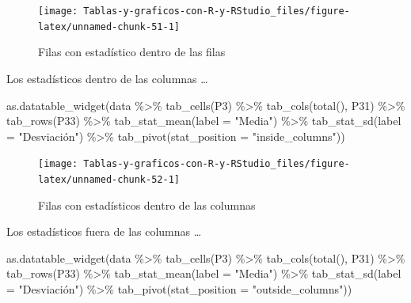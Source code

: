 \documentclass[
]{book}
\newenvironment{Shaded}{\begin{snugshade}}{\end{snugshade}}
\newcommand{\AttributeTok}[1]{\textcolor[rgb]{0.77,0.63,0.00}{#1}}
\newcommand{\FunctionTok}[1]{\textcolor[rgb]{0.00,0.00,0.00}{#1}}
\newcommand{\NormalTok}[1]{#1}
\newcommand{\SpecialCharTok}[1]{\textcolor[rgb]{0.00,0.00,0.00}{#1}}
\newcommand{\StringTok}[1]{\textcolor[rgb]{0.31,0.60,0.02}{#1}}
\begin{document}
\begin{figure}[H]

{\centering \texttt{[image: Tablas-y-graficos-con-R-y-RStudio\_files/figure-latex/unnamed-chunk-51-1]} 

}

\caption{Filas con estadístico dentro de las filas}\label{fig:unnamed-chunk-51}
\end{figure}

Los estadísticos dentro de las columnas \ldots{}

\begin{Shaded}
\begin{Highlighting}[]
\FunctionTok{as.datatable\_widget}\NormalTok{(data }\SpecialCharTok{\%\textgreater{}\%}
  \FunctionTok{tab\_cells}\NormalTok{(P3) }\SpecialCharTok{\%\textgreater{}\%}
  \FunctionTok{tab\_cols}\NormalTok{(}\FunctionTok{total}\NormalTok{(), P31) }\SpecialCharTok{\%\textgreater{}\%}
  \FunctionTok{tab\_rows}\NormalTok{(P33) }\SpecialCharTok{\%\textgreater{}\%}
  \FunctionTok{tab\_stat\_mean}\NormalTok{(}\AttributeTok{label =} \StringTok{"Media"}\NormalTok{) }\SpecialCharTok{\%\textgreater{}\%}
  \FunctionTok{tab\_stat\_sd}\NormalTok{(}\AttributeTok{label =} \StringTok{"Desviación"}\NormalTok{) }\SpecialCharTok{\%\textgreater{}\%}
  \FunctionTok{tab\_pivot}\NormalTok{(}\AttributeTok{stat\_position =} \StringTok{"inside\_columns"}\NormalTok{))}
\end{Highlighting}
\end{Shaded}

\begin{figure}[H]

{\centering \texttt{[image: Tablas-y-graficos-con-R-y-RStudio\_files/figure-latex/unnamed-chunk-52-1]} 

}

\caption{Filas con estadísticos dentro de las columnas}\label{fig:unnamed-chunk-52}
\end{figure}

Los estadísticos fuera de las columnas \ldots{}

\begin{Shaded}
\begin{Highlighting}[]
\FunctionTok{as.datatable\_widget}\NormalTok{(data }\SpecialCharTok{\%\textgreater{}\%}
  \FunctionTok{tab\_cells}\NormalTok{(P3) }\SpecialCharTok{\%\textgreater{}\%}
  \FunctionTok{tab\_cols}\NormalTok{(}\FunctionTok{total}\NormalTok{(), P31) }\SpecialCharTok{\%\textgreater{}\%}
  \FunctionTok{tab\_rows}\NormalTok{(P33) }\SpecialCharTok{\%\textgreater{}\%}
  \FunctionTok{tab\_stat\_mean}\NormalTok{(}\AttributeTok{label =} \StringTok{"Media"}\NormalTok{) }\SpecialCharTok{\%\textgreater{}\%}
  \FunctionTok{tab\_stat\_sd}\NormalTok{(}\AttributeTok{label =} \StringTok{"Desviación"}\NormalTok{) }\SpecialCharTok{\%\textgreater{}\%}
  \FunctionTok{tab\_pivot}\NormalTok{(}\AttributeTok{stat\_position =} \StringTok{"outside\_columns"}\NormalTok{))}
\end{Highlighting}
\end{Shaded}
\end{document}
